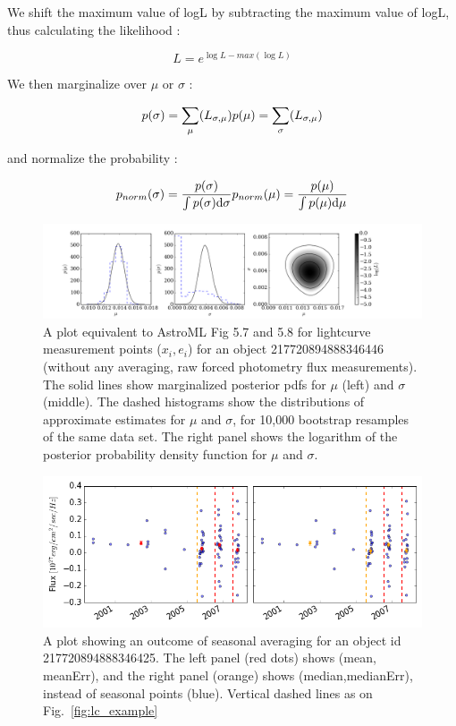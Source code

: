 \documentclass[fleqn,usenatbib]{mnras}  %
\begin{document}
We shift the maximum value of logL by subtracting the maximum value of logL, thus calculating the likelihood : 

\begin{equation}
L = e^{\log{L} - max(\log{L})}
\end{equation}

We then marginalize over $\mu$ or $\sigma$ : 

\begin{equation}
p(\sigma) = \sum_{\mu}(L_{\sigma,\mu}) \\
p(\mu) = \sum_{\sigma}(L_{\sigma,\mu})
\end{equation}

and normalize the probability :

\begin{equation}
p_{norm}(\sigma) = \frac{p(\sigma)}{ \int {p(\sigma) \text{d}\sigma}} \\ 
p_{norm}(\mu) = \frac{p(\mu)} {\int {p(\mu) \text{d}\mu} }
\end{equation}

\begin{figure}
\label{fig:sigma_example}
\includegraphics[width=\textwidth]{Fig_5-8_AstroML_obj_217720894888346446_.png}
\cprotect\caption{A plot equivalent to AstroML Fig 5.7 and 5.8 for lightcurve measurement points ($x_{i}, e_{i}$) for an object 217720894888346446 (without any averaging, raw forced photometry flux measurements). The solid lines show marginalized posterior pdfs for $\mu$ (left) and $\sigma$ (middle). The dashed histograms show the distributions of approximate estimates for $\mu$ and $\sigma$, for 10,000 bootstrap resamples of the same data set. The right panel shows the logarithm of the posterior probability density function for $\mu$ and $\sigma$.   }
\end{figure}


\begin{figure}
\label{fig:lc_example_seasonal}
 \includegraphics[width=\textwidth]{Lightcurve_full_seasonal_obj_217720894888346425.png}
 \cprotect\caption{A plot showing an outcome of seasonal averaging for an object id 217720894888346425. The left panel (red dots) shows  (mean, meanErr),  and the right panel (orange) shows (median,medianErr), instead of seasonal points (blue). Vertical dashed lines as on Fig.~\ref{fig:lc_example}}
\end{figure}
\end{document}
